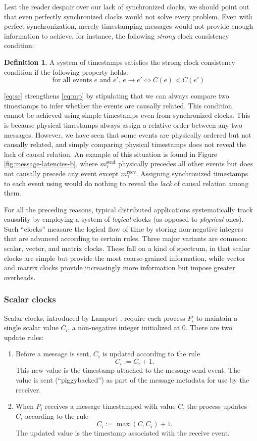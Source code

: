 \documentclass[]             %
{NASA}                       %
\theoremstyle{definition}
\newtheorem{definition}{Definition}[section]
\begin{document}
Lest the reader despair over our lack of synchronized clocks, we
should point out that even perfectly synchronized clocks would not
solve every problem. Even with perfect synchronization, merely
timestamping messages would not provide enough information to achieve,
for instance, the following \emph{strong} clock consistency condition:
\begin{definition}
  A system of timestamps satisfies the strong clock consistency
  condition if the following property holds:
  \[ \textrm{for all events $e$ and $e'$, } e \to e' \iff C(e) < C(e') \label{eq:sc}\tag{SC} \]
\end{definition}
\ref{eq:sc} strengthens \ref{eq:mp} by stipulating that we can always
compare two timestamps to infer whether the events are causally
related. This condition cannot be achieved using simple timestamps
even from synchronized clocks. This is because physical timestamps
always assign a relative order between any two messages. However, we
have seen that some events are physically ordered but not causally
related, and simply comparing physical timestamps does not reveal the
lack of causal relation. An example of this situation is found in
Figure \ref{fig:message-latencies-b}, where $m_1^\textrm{send}$
physically precedes all other events but does not causally precede any
event except $m_1^\textrm{recv}$. Assigning synchronized timestamps to
each event using would do nothing to reveal the \emph{lack} of causal
relation among them.

For all the preceding reasons, typical distributed applications
systematically track causality by employing a system of \emph{logical}
clocks (as opposed to \emph{physical} ones). Such ``clocks'' measure
the logical flow of time by storing non-negative integers that are
advanced according to certain rules. Three major variants are common:
scalar, vector, and matrix clocks. These fall on a kind of spectrum,
in that scalar clocks are simple but provide the most coarse-grained
information, while vector and matrix clocks provide increasingly more
information but impose greater overheads.

\subsubsection{Scalar clocks}
Scalar clocks, introduced by Lamport \cite{1978:lamportclocks},
require each process $P_i$ to maintain a single scalar value $C_i$, a
non-negative integer initialized at $0$. There are two update rules:
\begin{enumerate}
\item Before a message is sent, $C_i$ is updated according to the rule
  \[C_i := C_i + 1.\]
  This new value is the timestamp attached to the message send
  event. The value is sent (``piggybacked'') as part of the message
  metadata for use by the receiver.
\item When $P_i$ receives a message timestamped with value $C$, the
  process updates $C_i$ according to the rule
  \[C_i := \max(C, C_i) + 1.\]
  The updated value is the timestamp associated with the receive
  event.
\end{enumerate}
\end{document}
